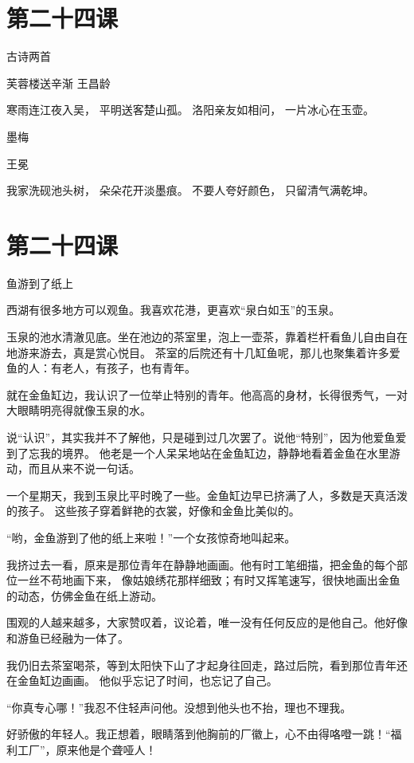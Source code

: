 \documentclass[12pt,UTF8]{ctexbook}
\begin{document}
\section{第二十四课}

古诗两首

芙蓉楼送辛渐 
王昌龄 

寒雨连江夜入吴，
平明送客楚山孤。
洛阳亲友如相问，
一片冰心在玉壶。

墨梅

王冕

我家洗砚池头树，
朵朵花开淡墨痕。
不要人夸好颜色，
只留清气满乾坤。

\section{第二十四课}

鱼游到了纸上

西湖有很多地方可以观鱼。我喜欢花港，更喜欢“泉白如玉”的玉泉。

玉泉的池水清澈见底。坐在池边的茶室里，泡上一壶茶，靠着栏杆看鱼儿自由自在地游来游去，真是赏心悦目。
茶室的后院还有十几缸鱼呢，那儿也聚集着许多爱鱼的人：有老人，有孩子，也有青年。

就在金鱼缸边，我认识了一位举止特别的青年。他高高的身材，长得很秀气，一对大眼睛明亮得就像玉泉的水。

说“认识”，其实我并不了解他，只是碰到过几次罢了。说他“特别”，因为他爱鱼爱到了忘我的境界。
他老是一个人呆呆地站在金鱼缸边，静静地看着金鱼在水里游动，而且从来不说一句话。

一个星期天，我到玉泉比平时晚了一些。金鱼缸边早已挤满了人，多数是天真活泼的孩子。
这些孩子穿着鲜艳的衣裳，好像和金鱼比美似的。

“哟，金鱼游到了他的纸上来啦！”一个女孩惊奇地叫起来。

我挤过去一看，原来是那位青年在静静地画画。他有时工笔细描，把金鱼的每个部位一丝不苟地画下来，
像姑娘绣花那样细致；有时又挥笔速写，很快地画出金鱼的动态，仿佛金鱼在纸上游动。

围观的人越来越多，大家赞叹着，议论着，唯一没有任何反应的是他自己。他好像和游鱼已经融为一体了。

我仍旧去茶室喝茶，等到太阳快下山了才起身往回走，路过后院，看到那位青年还在金鱼缸边画画。
他似乎忘记了时间，也忘记了自己。

“你真专心哪！”我忍不住轻声问他。没想到他头也不抬，理也不理我。

好骄傲的年轻人。我正想着，眼睛落到他胸前的厂徽上，心不由得咯噔一跳！“福利工厂”，原来他是个聋哑人！
\end{document}
